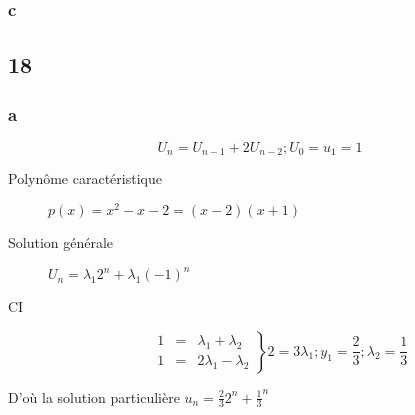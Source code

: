 \subsubsection{c}

\subsection{18}
\subsubsection{a}
$$	U_n = U_{n-1}+2U_{n-2} ; U_0 = u_1 = 1$$
\begin{description}
	\item[Polynôme caractéristique] $p(x) = x^2 -x - 2 = (x-2)(x+1)$
\item[Solution générale] $U_n = \lambda_1 2^n + \lambda_1 (-1)^n$
\item[CI]
\begin{displaymath}
	\left. \begin{array}{lll}
		1 &=&  \lambda_1 + \lambda_2\\
		1 &=&  2 \lambda_1 - \lambda_2
	\end{array}
	\right\}
	2 = 3 \lambda_1;
	y_1 = \frac{2}{3};
	\lambda_2 = \frac{1}{3}
\end{displaymath}
\end{description}
D'où la solution particulière $u_n = \frac{2}{3} 2^n + \frac{1}{3}^n$

